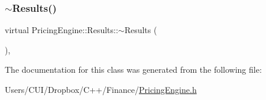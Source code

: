 \hypertarget{class_pricing_engine_1_1_results_a3a0c59acadf917438c07697f547de53e}{}\label{class_pricing_engine_1_1_results_a3a0c59acadf917438c07697f547de53e} 
\subsubsection{\texorpdfstring{$\sim$\+Results()}{~Results()}}
{\footnotesize\ttfamily virtual Pricing\+Engine\+::\+Results\+::$\sim$\+Results (\begin{DoxyParamCaption}{ }\end{DoxyParamCaption})\hspace{0.3cm}{\ttfamily [inline]}, {\ttfamily [virtual]}}



The documentation for this class was generated from the following file\+:\begin{DoxyCompactItemize}
\item 
Users/\+C\+U\+I/\+Dropbox/\+C++/\+Finance/\hyperlink{_pricing_engine_8h}{Pricing\+Engine.\+h}\end{DoxyCompactItemize}
